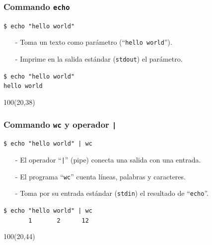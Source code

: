 \documentclass{beamer}
\begin{document}

\begin{frame}[fragile,t]
    \frametitle{Commando \texttt{echo}}
    \begin{block}{\vspace*{-3ex}}
    \texttt{\$}\verb: echo "hello world":
    \vspace*{0.5ex}
    \end{block}
    \begin{itemize}
    \item[-] Toma un texto como parámetro (``\texttt{hello world}'').
    \item[-] Imprime en la salida estándar (\verb|stdout|) el parámetro.
    \end{itemize}
    \vspace{2.5cm}
    \pause
    \begin{block}{\vspace*{-3ex}}
    \texttt{\$}\verb: echo "hello world":\\
    \verb:hello world:
    \vspace*{0.5ex}
    \end{block}
    \begin{textblock}{100}(20,38)
    \begin{center}
    \end{center}
    \end{textblock}
\end{frame}

\begin{frame}[fragile,t]
    \frametitle{Commando \texttt{wc} y operador \texttt{|}}
    \begin{block}{\vspace*{-3ex}}
    \texttt{\$}\verb: echo "hello world" | wc:
    \vspace*{0.5ex}
    \end{block}
    \begin{itemize}
    \item[-] El operador ``\verb.|.'' (pipe) conecta una salida con una entrada.
    \item[-] El programa ``\verb|wc|'' cuenta líneas, palabras y caracteres.
    \item[-] Toma por su entrada estándar (\verb|stdin|) el resultado de ``\verb|echo|''.
    \end{itemize}
    \vspace{2.5cm}
    \pause
    \begin{block}{\vspace*{-3ex}}
    \texttt{\$}\verb: echo "hello world" | wc:\\
    \verb:       1       2      12:
    \vspace*{0.5ex}
    \end{block}
    \begin{textblock}{100}(20,44)
    \begin{center}
    \end{center}
    \end{textblock}
\end{frame}
\end{document}
